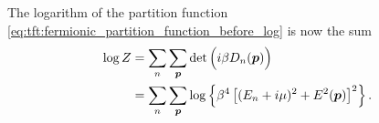 The logarithm of the partition function \eqref{eq:tft:fermionic_partition_function_before_log} is now the sum
\begin{equation}
\begin{split}
	\log Z & = \sum_n \sum_{\bm{p}} \operatorname{det} \Big( i \beta D_n({\bm{p}}) \Big) \\
	       & = \sum_n \sum_{\bm{p}} \log \left\{ \beta^4 \left[ (E_n + i \mu)^2 + E^2({\bm{p}}) \right]^2 \right\} . \\
\end{split}
\label{eq:tft:dirac_partition_function_with_i}
\end{equation}

